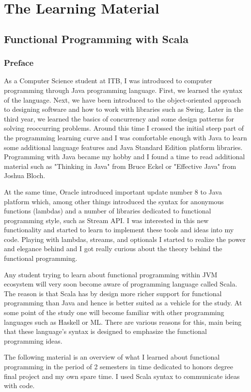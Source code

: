 \documentclass[12pt,twoside,a4paper]{report}
\begin{document}
\appendix
\chapter{The Learning Material}\label{A}
\section{Functional Programming with Scala}\label{A.2}
\subsection{Preface}\label{A.3}
As a Computer Science student at ITB, I was introduced to computer programming through Java programming language. First, we learned the syntax of the language. Next, we have been introduced to the object-oriented approach to designing software and how to work with libraries such as Swing. Later in the third year, we learned the basics of concurrency and some design patterns for solving reoccurring problems. Around this time I crossed the initial steep part of the programming learning curve and I was comfortable enough with Java to learn some additional language features and Java Standard Edition platform libraries. Programming with Java became my hobby and I found a time to read additional material such as "Thinking in Java" from Bruce Eckel or "Effective Java" from Joshua Bloch.\par
At the same time, Oracle introduced important update number 8 to Java platform which, among other things introduced the syntax for anonymous functions (lambdas) and a number of libraries dedicated to functional programming style, such as Stream API. I was interested in this new functionality and started to learn to implement these tools and ideas into my code. Playing with lambdas, streams, and optionals I started to realize the power and elegance behind and I got really curious about the theory behind the functional programming.\par
Any student trying to learn about functional programming within JVM ecosystem will very soon become aware of programming language called Scala. The reason is that Scala has by design more richer support for functional programming than Java and hence is better suited as a vehicle for the study. At some point of the study one will become familiar with other programming languages such as Haskell or ML. There are various reasons for this, main being that these language's syntax is designed to emphasize the functional programming ideas.\par
The following material is an overview of what I learned about functional programming in the period of 2 semesters in time dedicated to honors degree final project and my own spare time. I used Scala syntax to communicate ideas with code.
\end{document}
